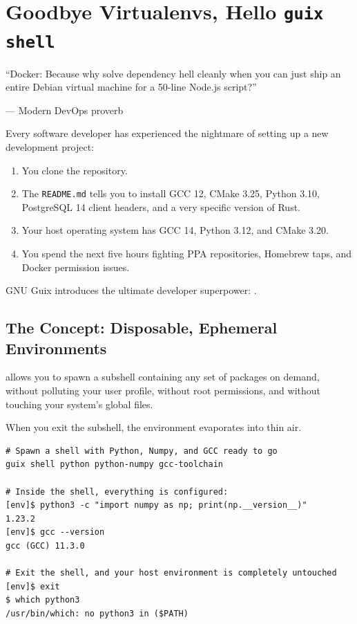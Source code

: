 \chapter{Goodbye Virtualenvs, Hello \texttt{guix shell}}
\label{chap:guix-shell}

\epigraph{``Docker: Because why solve dependency hell cleanly when you can just ship an entire Debian virtual machine for a 50-line Node.js script?''}{--- Modern DevOps proverb}

\noindent
Every software developer has experienced the nightmare of setting up a new development project:
\begin{enumerate}
  \item You clone the repository.
  \item The \texttt{README.md} tells you to install GCC 12, CMake 3.25, Python 3.10, PostgreSQL 14 client headers, and a very specific version of Rust.
  \item Your host operating system has GCC 14, Python 3.12, and CMake 3.20.
  \item You spend the next five hours fighting PPA repositories, Homebrew taps, and Docker permission issues.
\end{enumerate}

GNU Guix introduces the ultimate developer superpower: .

\section{The Concept: Disposable, Ephemeral Environments}

 allows you to spawn a subshell containing any set of packages on demand, without polluting your user profile, without root permissions, and without touching your system's global files.

When you exit the subshell, the environment evaporates into thin air.

\begin{lstlisting}[style=guixcli]
# Spawn a shell with Python, Numpy, and GCC ready to go
guix shell python python-numpy gcc-toolchain

# Inside the shell, everything is configured:
[env]$ python3 -c "import numpy as np; print(np.__version__)"
1.23.2
[env]$ gcc --version
gcc (GCC) 11.3.0

# Exit the shell, and your host environment is completely untouched
[env]$ exit
$ which python3
/usr/bin/which: no python3 in ($PATH)
\end{lstlisting}

